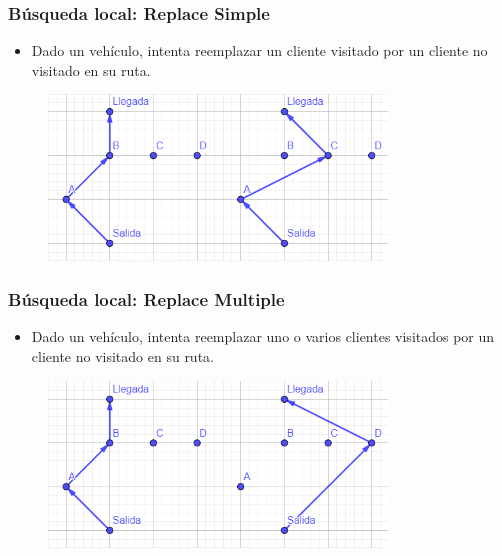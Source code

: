 \documentclass{beamer}
\begin{document}

\begin{frame}
\frametitle{Búsqueda local: Replace Simple}

\begin{itemize}
    \item Dado un vehículo, intenta reemplazar un cliente visitado por un cliente no visitado en su ruta.
\end{itemize}

\begin{figure}[h]
	\centering
	\includegraphics[width=9cm]{blreplaceSimple}
	\label{fig:blreplaceSimple}
\end{figure}

\end{frame}


\begin{frame}
\frametitle{Búsqueda local: Replace Multiple}

\begin{itemize}
    \item Dado un vehículo, intenta reemplazar uno o varios clientes visitados por un cliente no visitado en su ruta.
\end{itemize}

\begin{figure}[h]
	\centering
	\includegraphics[width=9cm]{blreplaceMultiple}
	\label{fig:blreplaceMultiple}
\end{figure}

\end{frame}
\end{document}
